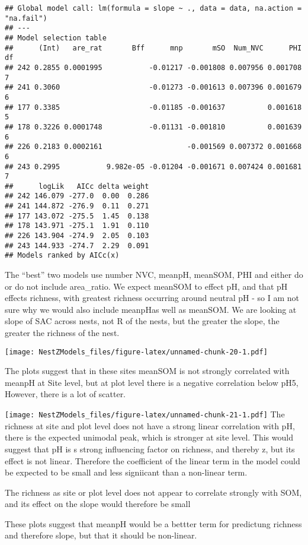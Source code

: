 \documentclass[]{article}
\begin{document}
\begin{verbatim}
## Global model call: lm(formula = slope ~ ., data = data, na.action = "na.fail")
## ---
## Model selection table 
##      (Int)   are_rat       Bff      mnp       mSO  Num_NVC      PHI df
## 242 0.2855 0.0001995           -0.01217 -0.001808 0.007956 0.001708  7
## 241 0.3060                     -0.01273 -0.001613 0.007396 0.001679  6
## 177 0.3385                     -0.01185 -0.001637          0.001618  5
## 178 0.3226 0.0001748           -0.01131 -0.001810          0.001639  6
## 226 0.2183 0.0002161                    -0.001569 0.007372 0.001668  6
## 243 0.2995           9.982e-05 -0.01204 -0.001671 0.007424 0.001681  7
##      logLik   AICc delta weight
## 242 146.079 -277.0  0.00  0.286
## 241 144.872 -276.9  0.11  0.271
## 177 143.072 -275.5  1.45  0.138
## 178 143.971 -275.1  1.91  0.110
## 226 143.904 -274.9  2.05  0.103
## 243 144.933 -274.7  2.29  0.091
## Models ranked by AICc(x)
\end{verbatim}

The ``best'' two models use number NVC, meanpH, meanSOM, PHI and either
do or do not include area\_ratio. We expect meanSOM to effect pH, and
that pH effects richness, with greatest richness occurring around
neutral pH - so I am not sure why we would also include meanpHas well as
meanSOM. We are looking at slope of SAC across nests, not R of the
nests, but the greater the slope, the greater the richness of the nest.

\texttt{[image: NestZModels\_files/figure-latex/unnamed-chunk-20-1.pdf]}

The plots suggest that in these sites meanSOM is not strongly correlated
with meanpH at Site level, but at plot level there is a negative
correlation below pH5, However, there is a lot of scatter.

\texttt{[image: NestZModels\_files/figure-latex/unnamed-chunk-21-1.pdf]}
The richness at site and plot level does not have a strong linear
correlation with pH, there is the expected unimodal peak, which is
stronger at site level. This would suggest that pH is s strong
influencing factor on richness, and thereby z, but its effect is not
linear. Therefore the coefficient of the linear term in the model could
be expected to be small and less signiicant than a non-linear term.

The richness as site or plot level does not appear to correlate strongly
with SOM, and its effect on the slope would therefore be small

These plots suggest that meanpH would be a bettter term for predictung
richness and therefore slope, but that it should be non-linear.
\end{document}
